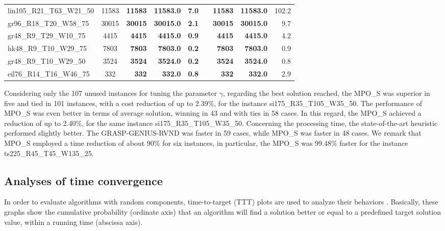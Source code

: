 \documentclass{singlecol-new}
\theoremstyle{TH}{
\newtheorem{lemma}{Lemma}
\newtheorem{theorem}[lemma]{Theorem}
\newtheorem{corrolary}[lemma]{Corrolary}
\newtheorem{conjecture}[lemma]{Conjecture}
\newtheorem{proposition}[lemma]{Proposition}
\newtheorem{claim}[lemma]{Claim}
\newtheorem{stheorem}[lemma]{Wrong Theorem}
}
\theoremstyle{THrm}{
\newtheorem{definition}{Definition}[section]
\newtheorem{question}{Question}[section]
\newtheorem{remark}{Remark}
\newtheorem{scheme}{Scheme}
}
\theoremstyle{THhit}{
\newtheorem{case}{Case}[section]
}
\begin{document}
\begin{table}[]
{\begin{tabular}{lcrrrrrrr}
		lin105\_R21\_T63\_W21\_50  & 11583                & \textbf{11583}  & \textbf{11583.0}  & \textbf{7.0}    &  & \textbf{11583}  & \textbf{11583.0} & 102.2           \\
		gr96\_R18\_T20\_W58\_75    & 30015                & \textbf{30015}  & \textbf{30015.0}  & \textbf{2.1}    &  & \textbf{30015}  & \textbf{30015.0} & 9.7             \\
		gr48\_R9\_T29\_W10\_75     & 4415                 & \textbf{4415}   & \textbf{4415.0}   & \textbf{0.9}    &  & \textbf{4415}   & \textbf{4415.0}  & 4.2             \\
		hk48\_R9\_T10\_W29\_75     & 7803                 & \textbf{7803}   & \textbf{7803.0}   & \textbf{0.2}    &  & \textbf{7803}   & \textbf{7803.0}  & 0.9             \\
		gr48\_R9\_T10\_W29\_50     & 3524                 & \textbf{3524}   & \textbf{3524.0}   & \textbf{0.2}    &  & \textbf{3524}   & \textbf{3524.0}  & 0.8             \\
		eil76\_R14\_T16\_W46\_75   & 332                  & \textbf{332}    & \textbf{332.0}    & \textbf{0.8}    &  & \textbf{332}    & \textbf{332.0}   & 2.9   \\
		\hline          
	\end{tabular}
}
\end{table}

Considering only the 107 unused instances for tuning the parameter $ \gamma$, regarding the best solution reached, the MPO\_S was superior in five and tied in 101 instances, with a cost reduction of up to 2.39\%, for the instance si175\_\-R35\_\-T105\_\-W35\_50. The performance of MPO\_S was even better in terms of average solution, winning in 43 and with ties in 58 cases. In this regard, the MPO\_S achieved a reduction of up to 2.40\%, for the same instance si175\_R35\_T105\_W35\_50.  Concerning the processing time, the state-of-the-art heuristic performed slightly better. The GRASP-GENIUS-RVND was faster in 59 cases, while MPO\_S was faster in 48 cases. We remark that MPO\_S employed a time reduction of about 90\% for six instances, in particular, the MPO\_S was 99.48\% faster for the instance ts225\_R45\_T45\_W135\_25.





\subsection{Analyses of time convergence}
In order to evaluate algorithms with random components, time-to-target (TTT) plots are used to analyze their behaviors \citep{aiex2007ttt}. Basically, these graphs show the cumulative probability (ordinate
axis) that an algorithm will find a solution better or equal to a predefined target solution value,  within a running time (abscissa axis).
\end{document}

